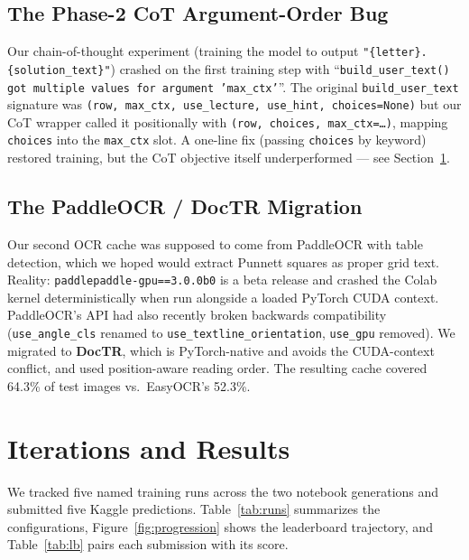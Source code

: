 \documentclass[11pt]{article}
\begin{document}
\subsection{The Phase-2 CoT Argument-Order Bug}
Our chain-of-thought experiment (training the model to output \texttt{"\{letter\}. \{solution\_text\}"}) crashed on the first training step with ``\texttt{build\_user\_text() got multiple values for argument 'max\_ctx'}''. The original \texttt{build\_user\_text} signature was \texttt{(row, max\_ctx, use\_lecture, use\_hint, choices=None)} but our CoT wrapper called it positionally with \texttt{(row, choices, max\_ctx=\dots)}, mapping \texttt{choices} into the \texttt{max\_ctx} slot. A one-line fix (passing \texttt{choices} by keyword) restored training, but the CoT objective itself underperformed --- see Section~\ref{sec:experiments}.

\subsection{The PaddleOCR / DocTR Migration}
Our second OCR cache was supposed to come from PaddleOCR with table detection, which we hoped would extract Punnett squares as proper grid text. Reality: \texttt{paddlepaddle-gpu==3.0.0b0} is a beta release and crashed the Colab kernel deterministically when run alongside a loaded PyTorch CUDA context. PaddleOCR's API had also recently broken backwards compatibility (\texttt{use\_angle\_cls} renamed to \texttt{use\_textline\_orientation}, \texttt{use\_gpu} removed). We migrated to \textbf{DocTR}, which is PyTorch-native and avoids the CUDA-context conflict, and used position-aware reading order. The resulting cache covered 64.3\% of test images vs.\ EasyOCR's 52.3\%.

\section{Iterations and Results}
\label{sec:experiments}

We tracked five named training runs across the two notebook generations and submitted five Kaggle predictions. Table~\ref{tab:runs} summarizes the configurations, Figure~\ref{fig:progression} shows the leaderboard trajectory, and Table~\ref{tab:lb} pairs each submission with its score.
\end{document}
